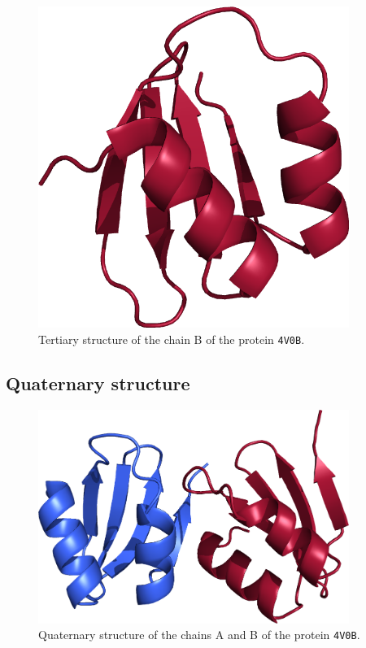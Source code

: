 \begin{figure}
\centering
\includegraphics[width=0.9\textwidth]{bioinfo/figures/tertiary}
\caption{Tertiary structure of the chain B of the protein \texttt{4V0B}.}\label{fig:tertiary}
\end{figure}

\subsection{Quaternary structure}
\begin{figure}
\centering
\includegraphics[width=0.9\textwidth]{bioinfo/figures/quaternary}
\caption{Quaternary structure of the chains A and B of the protein \texttt{4V0B}.}\label{fig:quaternary}
\end{figure}

